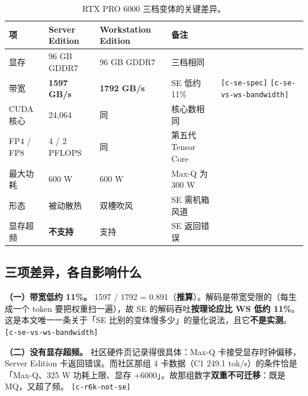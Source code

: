 \begin{table}[t]
\centering
\footnotesize
\setlength{\tabcolsep}{4pt}
\caption{RTX PRO 6000 三档变体的关键差异。}
\label{tab:4}
\begin{tabularx}{\textwidth}{llllX}
\toprule
项 & Server Edition & Workstation Edition & 备注 &  \\
\midrule
显存 & 96 GB GDDR7 & 96 GB GDDR7 & 三档相同 &  \\
带宽 & \textbf{1597 GB/s} & \textbf{1792 GB/s} & SE 低约 11\% & {\scriptsize\texttt{[c-\hspace{0pt}se-\hspace{0pt}spec]}} {\scriptsize\texttt{[c-\hspace{0pt}se-\hspace{0pt}vs-\hspace{0pt}ws-\hspace{0pt}bandwidth]}} \\
CUDA 核心 & 24,064 & 同 & 核心数相同 &  \\
FP4 / FP8 & 4 / 2 PFLOPS & 同 & 第五代 Tensor Core &  \\
最大功耗 & 600 W & 600 W & Max-Q 为 300 W &  \\
形态 & 被动散热 & 双槽吹风 & SE 需机箱风道 &  \\
显存超频 & \textbf{不支持} & 支持 & SE 返回错误 &  \\
\bottomrule
\end{tabularx}
\end{table}

\subsection{三项差异，各自影响什么}

\textbf{（一）带宽低约 11\%。} 1597 / 1792 = 0.891（\textbf{推算}）。解码是带宽受限的（每生成一个 token 要把权重扫一遍），故 SE 的解码吞吐\textbf{按理论应比 WS 低约 11\%}。这是本文唯一一条关于「SE 比别的变体慢多少」的量化说法，且它\textbf{不是实测}。 {\scriptsize\texttt{[c-\hspace{0pt}se-\hspace{0pt}vs-\hspace{0pt}ws-\hspace{0pt}bandwidth]}}


\textbf{（二）没有显存超频。} 社区硬件页记录得很具体：Max-Q 卡接受显存时钟偏移，Server Edition 卡返回错误。而社区那组 4 卡数据（C1 249.1 tok/s）的条件恰是「Max-Q、325 W 功耗上限、显存 +6000」。故那组数字\textbf{双重不可迁移}：既是 MQ，又超了频。 {\scriptsize\texttt{[c-\hspace{0pt}r6k-\hspace{0pt}not-\hspace{0pt}se]}}


